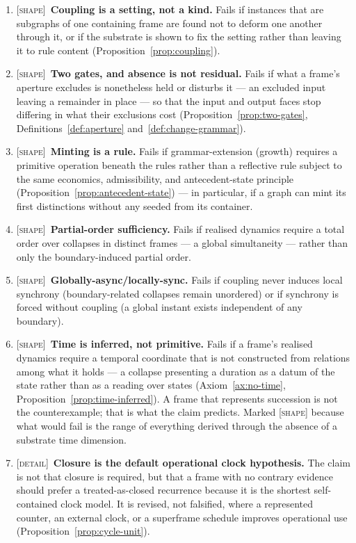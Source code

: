\documentclass[11pt,a4paper]{article}
\theoremstyle{remark}\newtheorem{remark}[definition]{Remark}
\begin{document}
\begin{enumerate}[leftmargin=*]
\item \textsc{[shape]}~\textbf{Coupling is a setting, not a kind.} Fails if instances that are subgraphs of one containing frame are found not to deform one another through it, or if the substrate is shown to fix the setting rather than leaving it to rule content (Proposition~\ref{prop:coupling}).
\item \textsc{[shape]}~\textbf{Two gates, and absence is not residual.} Fails if what a frame's aperture excludes is nonetheless held or disturbs it --- an excluded input leaving a remainder in place --- so that the input and output faces stop differing in what their exclusions cost (Proposition~\ref{prop:two-gates}, Definitions~\ref{def:aperture} and~\ref{def:change-grammar}).
\item \textsc{[shape]}~\textbf{Minting is a rule.} Fails if grammar-extension (growth) requires a primitive operation beneath the rules rather than a reflective rule subject to the same economics, admissibility, and antecedent-state principle (Proposition~\ref{prop:antecedent-state}) --- in particular, if a graph can mint its first distinctions without any seeded from its container.
\item \textsc{[shape]}~\textbf{Partial-order sufficiency.} Fails if realised dynamics require a total order over collapses in distinct frames --- a global simultaneity --- rather than only the boundary-induced partial order.
\item \textsc{[shape]}~\textbf{Globally-async/locally-sync.} Fails if coupling never induces local synchrony (boundary-related collapses remain unordered) or if synchrony is forced without coupling (a global instant exists independent of any boundary).
\item \textsc{[shape]}~\textbf{Time is inferred, not primitive.} Fails if a frame's realised dynamics require a temporal coordinate that is not constructed from relations among what it holds --- a collapse presenting a duration as a datum of the state rather than as a reading over states (Axiom~\ref{ax:no-time}, Proposition~\ref{prop:time-inferred}). A frame that represents succession is not the counterexample; that is what the claim predicts. Marked \textsc{[shape]} because what would fail is the range of everything derived through the absence of a substrate time dimension.
\item \textsc{[detail]}~\textbf{Closure is the default operational clock hypothesis.} The claim is not that closure is required, but that a frame with no contrary evidence should prefer a treated-as-closed recurrence because it is the shortest self-contained clock model. It is revised, not falsified, where a represented counter, an external clock, or a superframe schedule improves operational use (Proposition~\ref{prop:cycle-unit}).

\end{enumerate}
\end{document}
